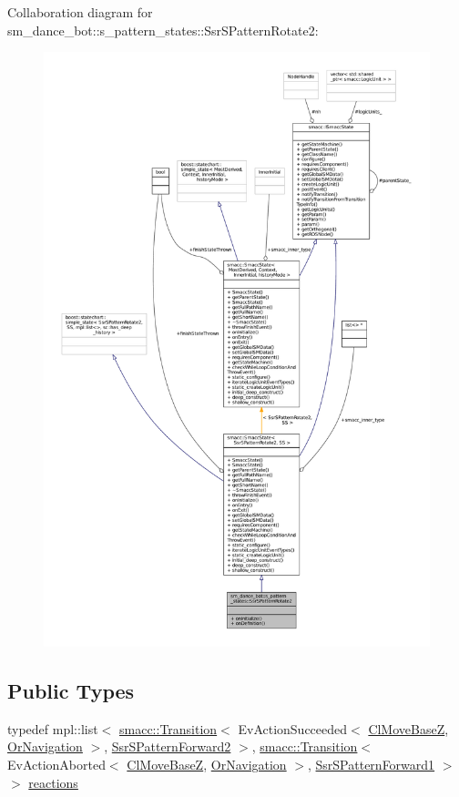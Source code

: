 Collaboration diagram for sm\+\_\+dance\+\_\+bot\+:\+:s\+\_\+pattern\+\_\+states\+:\+:Ssr\+S\+Pattern\+Rotate2\+:
\nopagebreak
\begin{figure}[H]
\begin{center}
\leavevmode
\includegraphics[width=350pt]{structsm__dance__bot_1_1s__pattern__states_1_1SsrSPatternRotate2__coll__graph}
\end{center}
\end{figure}
\subsection*{Public Types}
\begin{DoxyCompactItemize}
\item 
typedef mpl\+::list$<$ \hyperlink{classsmacc_1_1Transition}{smacc\+::\+Transition}$<$ Ev\+Action\+Succeeded$<$ \hyperlink{classmove__base__z__client_1_1ClMoveBaseZ}{Cl\+Move\+BaseZ}, \hyperlink{classsm__dance__bot_1_1OrNavigation}{Or\+Navigation} $>$, \hyperlink{structsm__dance__bot_1_1s__pattern__states_1_1SsrSPatternForward2}{Ssr\+S\+Pattern\+Forward2} $>$, \hyperlink{classsmacc_1_1Transition}{smacc\+::\+Transition}$<$ Ev\+Action\+Aborted$<$ \hyperlink{classmove__base__z__client_1_1ClMoveBaseZ}{Cl\+Move\+BaseZ}, \hyperlink{classsm__dance__bot_1_1OrNavigation}{Or\+Navigation} $>$, \hyperlink{structsm__dance__bot_1_1s__pattern__states_1_1SsrSPatternForward1}{Ssr\+S\+Pattern\+Forward1} $>$ $>$ \hyperlink{structsm__dance__bot_1_1s__pattern__states_1_1SsrSPatternRotate2_a9d2e87a10542543510a4b4030d3a5c54}{reactions}
\end{DoxyCompactItemize}
